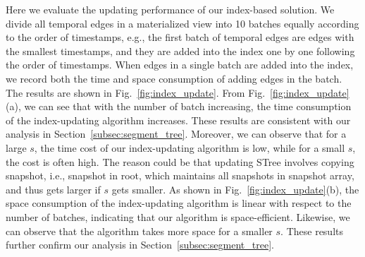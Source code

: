 \documentclass[10pt,journal,compsoc]{IEEEtran}
\begin{document}
 Here we evaluate the updating performance of our index-based solution. We divide all temporal edges in a materialized view into 10 batches equally according to the order of timestamps, e.g., the first batch of temporal edges are edges with the smallest timestamps, and they are added into the index one by one following the order of timestamps. When edges in a single batch are added into the index, we record both the time and space consumption of adding edges in the batch. The results are shown in Fig.~\ref{fig:index_update}. From Fig.~\ref{fig:index_update}(a), we can see that with the number of batch increasing, the time consumption of the index-updating algorithm increases. These results are consistent with our analysis in Section~\ref{subsec:segment_tree}. Moreover, we can observe that for a large $s$, the time cost of our index-updating algorithm is low, while for a small $s$, the cost is often high. The reason could be that updating STree involves copying snapshot, i.e., snapshot in root, which maintains all snapshots in snapshot array, and thus gets larger if $ s $ gets smaller. As shown in Fig.~\ref{fig:index_update}(b), the space consumption of the index-updating algorithm is linear with respect to the number of batches, indicating that our algorithm is space-efficient. Likewise, we can observe that the algorithm takes more space for a smaller $s$. These results further confirm our analysis in Section~\ref{subsec:segment_tree}.
\end{document}
